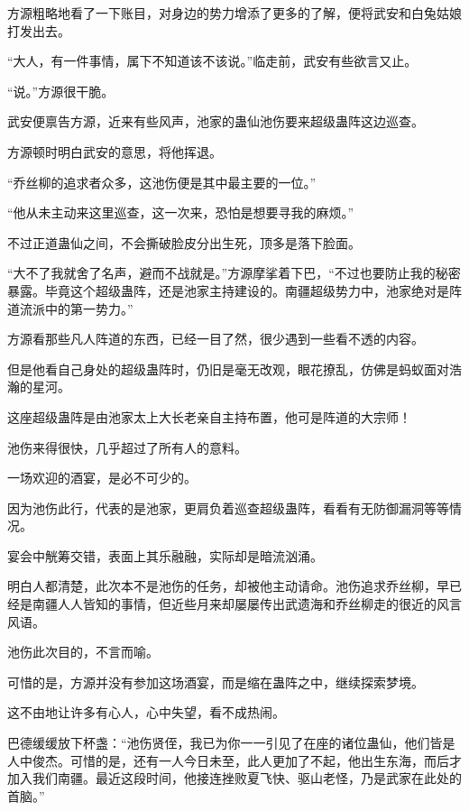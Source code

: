 
\begin{this_body}



方源粗略地看了一下账目，对身边的势力增添了更多的了解，便将武安和白兔姑娘打发出去。

“大人，有一件事情，属下不知道该不该说。”临走前，武安有些欲言又止。

“说。”方源很干脆。

武安便禀告方源，近来有些风声，池家的蛊仙池伤要来超级蛊阵这边巡查。

方源顿时明白武安的意思，将他挥退。

“乔丝柳的追求者众多，这池伤便是其中最主要的一位。”

“他从未主动来这里巡查，这一次来，恐怕是想要寻我的麻烦。”

不过正道蛊仙之间，不会撕破脸皮分出生死，顶多是落下脸面。

“大不了我就舍了名声，避而不战就是。”方源摩挲着下巴，“不过也要防止我的秘密暴露。毕竟这个超级蛊阵，还是池家主持建设的。南疆超级势力中，池家绝对是阵道流派中的第一势力。”

方源看那些凡人阵道的东西，已经一目了然，很少遇到一些看不透的内容。

但是他看自己身处的超级蛊阵时，仍旧是毫无改观，眼花撩乱，仿佛是蚂蚁面对浩瀚的星河。

这座超级蛊阵是由池家太上大长老亲自主持布置，他可是阵道的大宗师！

池伤来得很快，几乎超过了所有人的意料。

一场欢迎的酒宴，是必不可少的。

因为池伤此行，代表的是池家，更肩负着巡查超级蛊阵，看看有无防御漏洞等等情况。

宴会中觥筹交错，表面上其乐融融，实际却是暗流汹涌。

明白人都清楚，此次本不是池伤的任务，却被他主动请命。池伤追求乔丝柳，早已经是南疆人人皆知的事情，但近些月来却屡屡传出武遗海和乔丝柳走的很近的风言风语。

池伤此次目的，不言而喻。

可惜的是，方源并没有参加这场酒宴，而是缩在蛊阵之中，继续探索梦境。

这不由地让许多有心人，心中失望，看不成热闹。

巴德缓缓放下杯盏：“池伤贤侄，我已为你一一引见了在座的诸位蛊仙，他们皆是人中俊杰。可惜的是，还有一人今日未至，此人更加了不起，他出生东海，而后才加入我们南疆。最近这段时间，他接连挫败夏飞快、驱山老怪，乃是武家在此处的首脑。”


\end{this_body}
